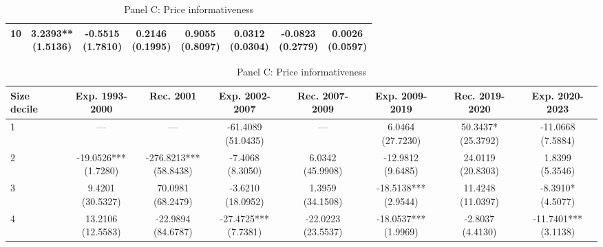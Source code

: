 \begin{table}[!htbp]
\begin{threeparttable}
\begin{subtable}[t]{\textwidth}
\begin{tabular}{@{}lccccccc@{}}
10 & \shortstack{3.2393**\\(1.5136)} & \shortstack{-0.5515\\(1.7810)} & \shortstack{0.2146\\(0.1995)} & \shortstack{0.9055\\(0.8097)} & \shortstack{0.0312\\(0.0304)} & \shortstack{-0.0823\\(0.2779)} & \shortstack{0.0026\\(0.0597)} \\
\bottomrule
\end{tabular}
\end{subtable}
\vspace{0.45em}
\begin{subtable}[t]{\textwidth}
\caption{Panel C: Price informativeness}
\centering
\begin{tabular}{@{}lccccccc@{}}
\toprule
Size decile & Exp. 1993-2000 & Rec. 2001 & Exp. 2002-2007 & Rec. 2007-2009 & Exp. 2009-2019 & Rec. 2019-2020 & Exp. 2020-2023 \\
\midrule
1 & — & — & \shortstack{-61.4089\\(51.0435)} & — & \shortstack{6.0464\\(27.7230)} & \shortstack{50.3437*\\(25.3792)} & \shortstack{-11.0668\\(7.5884)} \\
2 & \shortstack{-19.0526***\\(1.7280)} & \shortstack{-276.8213***\\(58.8438)} & \shortstack{-7.4068\\(8.3050)} & \shortstack{6.0342\\(45.9908)} & \shortstack{-12.9812\\(9.6485)} & \shortstack{24.0119\\(20.8303)} & \shortstack{1.8399\\(5.3546)} \\
3 & \shortstack{9.4201\\(30.5327)} & \shortstack{70.0981\\(68.2479)} & \shortstack{-3.6210\\(18.0952)} & \shortstack{1.3959\\(34.1508)} & \shortstack{-18.5138***\\(2.9544)} & \shortstack{11.4248\\(11.0397)} & \shortstack{-8.3910*\\(4.5077)} \\
4 & \shortstack{13.2106\\(12.5583)} & \shortstack{-22.9894\\(84.6787)} & \shortstack{-27.4725***\\(7.7381)} & \shortstack{-22.0223\\(23.5537)} & \shortstack{-18.0537***\\(1.9969)} & \shortstack{-2.8037\\(4.4130)} & \shortstack{-11.7401***\\(3.1138)} \\

\end{tabular}
\end{subtable}
\end{threeparttable}
\end{table}
